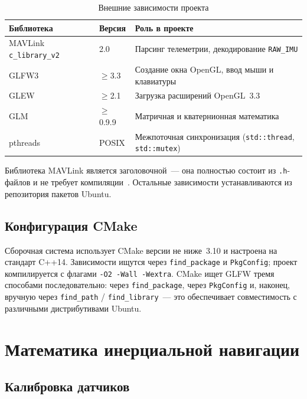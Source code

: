 \begin{table}[H]
\centering
\caption{Внешние зависимости проекта}
\label{tab:deps}
\begin{tabularx}{\textwidth}{|l|l|X|}
\hline
\textbf{Библиотека} & \textbf{Версия} & \textbf{Роль в проекте} \\
\hline
MAVLink \texttt{c\_library\_v2}~\cite{mavlink_docs} & 2.0
    & Парсинг телеметрии, декодирование \texttt{RAW\_IMU} \\
\hline
GLFW3~\cite{glfw_docs} & $\geq$3.3
    & Создание окна OpenGL, ввод мыши и клавиатуры \\
\hline
GLEW & $\geq$2.1
    & Загрузка расширений OpenGL~3.3 \\
\hline
GLM  & $\geq$0.9.9
    & Матричная и кватернионная математика \\
\hline
pthreads & POSIX
    & Межпоточная синхронизация (\texttt{std::thread}, \texttt{std::mutex}) \\
\hline
\end{tabularx}
\end{table}
 
Библиотека MAVLink является заголовочной~--- она полностью состоит из
\texttt{.h}-файлов и не требует компиляции~\cite{mavlink_proto}. Остальные
зависимости устанавливаются из репозитория пакетов Ubuntu.
 
\subsection{Конфигурация CMake}
 
Сборочная система использует CMake версии не ниже~3.10 и настроена на
стандарт C++14. Зависимости ищутся через \texttt{find\_package} и
\texttt{PkgConfig}; проект компилируется с флагами \texttt{-O2 -Wall -Wextra}.
CMake ищет GLFW тремя способами последовательно: через \texttt{find\_package},
через \texttt{PkgConfig} и, наконец, вручную через \texttt{find\_path} /
\texttt{find\_library}~--- это обеспечивает совместимость с различными
дистрибутивами Ubuntu.
 
\newpage
 
\section{Математика инерциальной навигации}
 
\subsection{Калибровка датчиков}
 
